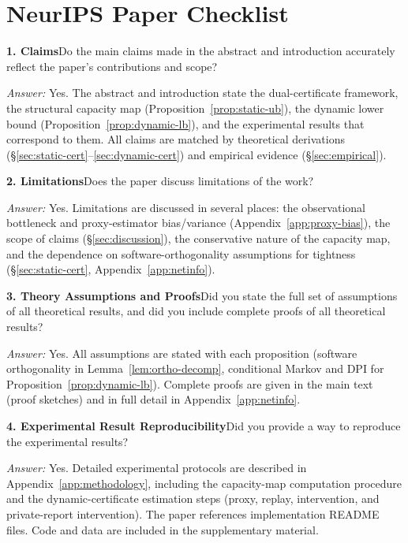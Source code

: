 \documentclass{article}
\begin{document}
  
  

  \section*{NeurIPS Paper Checklist}

  \noindent\textbf{1. Claims}\quad Do the main claims made in the abstract and
  introduction accurately reflect the paper's contributions and scope?

  \emph{Answer:} Yes. The abstract and introduction state the dual-certificate
  framework, the structural capacity map (Proposition~\ref{prop:static-ub}), the
  dynamic lower bound (Proposition~\ref{prop:dynamic-lb}), and the experimental
  results that correspond to them. All claims are matched by theoretical
  derivations (\S\ref{sec:static-cert}--\ref{sec:dynamic-cert}) and empirical
  evidence (\S\ref{sec:empirical}).

  \noindent\textbf{2. Limitations}\quad Does the paper discuss limitations of
  the work?

  \emph{Answer:} Yes. Limitations are discussed in several places: the
  observational bottleneck and proxy-estimator bias/variance
  (Appendix~\ref{app:proxy-bias}), the scope of claims (\S\ref{sec:discussion}),
   the conservative nature of the capacity map, and the dependence on
  software-orthogonality assumptions for tightness (\S\ref{sec:static-cert},
  Appendix~\ref{app:netinfo}).

  \noindent\textbf{3. Theory Assumptions and Proofs}\quad Did you state the full
   set of assumptions of all theoretical results, and did you include complete
  proofs of all theoretical results?

  \emph{Answer:} Yes. All assumptions are stated with each proposition (software
   orthogonality in Lemma~\ref{lem:ortho-decomp}, conditional Markov and DPI for
   Proposition~\ref{prop:dynamic-lb}). Complete proofs are given in the main
  text (proof sketches) and in full detail in Appendix~\ref{app:netinfo}.

  \noindent\textbf{4. Experimental Result Reproducibility}\quad Did you provide
  a way to reproduce the experimental results?

  \emph{Answer:} Yes. Detailed experimental protocols are described in
  Appendix~\ref{app:methodology}, including the capacity-map computation
  procedure and the dynamic-certificate estimation steps (proxy, replay,
  intervention, and private-report intervention). The paper references
  implementation README files. Code and data are included in the supplementary
  material.
\end{document}
